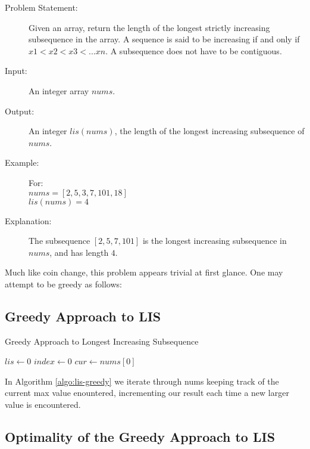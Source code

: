 
\begin{description}
    \item[Problem Statement:]
        Given an array, return the length of the longest strictly increasing subsequence in the array.
        A sequence is said to be increasing if and only if \\$x1<x2<x3<...xn$.
        A subsequence does not have to be contiguous.

    \item[Input:]
        An integer array $nums$.
        
    \item[Output:]
        An integer $lis(nums)$, the length of the longest increasing subsequence of $nums$.
    \item[Example:] For:\\
        $nums = [2,5,3,7,101,18]$\\
        $lis(nums) = 4$

    \item[Explanation:]
    The subsequence $[2,5,7,101]$ is the longest increasing subsequence in $nums$, and has length $4$.

        
\end{description}

Much like coin change, this problem appears trivial at first glance. One may attempt to be greedy as follows:

\subsection{Greedy Approach to LIS}

\begin{algorithm}
    \caption{Greedy Approach to Longest Increasing Subsequence}
    \label{algo:lis-greedy}
    $lis \leftarrow 0$\;
    $index \leftarrow 0$\;
    $cur \leftarrow nums[0]$\;
\end{algorithm}
In Algorithm \ref{algo:lis-greedy} we iterate through nums keeping track of the current max value enountered, incrementing our result each time a new larger value is encountered.

\subsection{Optimality of the Greedy Approach to LIS}

